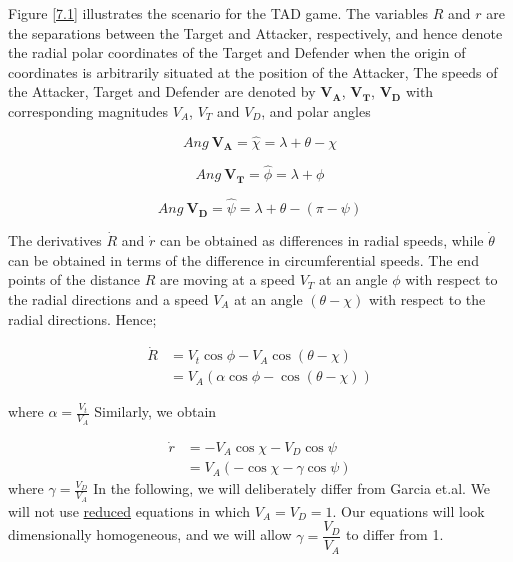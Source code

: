 Figure \ref{7.1} illustrates the scenario for the TAD game. The variables $R$ and $r$ are the separations between the Target and Attacker, respectively, and hence denote the radial polar coordinates of the Target and Defender when the origin of coordinates is arbitrarily situated at the position of the Attacker, The speeds of the Attacker, Target and Defender are denoted by $\boldsymbol{V_A}$, $\boldsymbol{V_T}$, $\boldsymbol{V_D}$ with corresponding magnitudes $V_A$, $V_T$ and $V_D$, and polar angles 

\begin{equation}
	Ang\ \boldsymbol{V_A} = \hat{\chi} = \lambda+\theta-\chi
\end{equation}

\begin{equation}
Ang\ \boldsymbol{V_T} = \hat{\phi} = \lambda+\phi
\end{equation}

\begin{equation}
Ang\ \boldsymbol{V_D} = \hat{\psi} = \lambda+\theta-(\pi - \psi)
\end{equation}



The derivatives $\dot{R}$ and $\dot{r}$ can be obtained as differences in radial speeds, while $\dot{\theta}$ can be obtained in terms of the difference in circumferential speeds. The end points of the distance $R$ are moving at a speed $V_T$ at an angle $\phi$ with respect to the radial directions and a speed $V_A$ at an angle $(\theta - \chi)$ with respect to the radial directions. Hence;

\begin{equation}
\begin{split}
\dot{R} &= V_t \cos \phi - V_A \cos(\theta - \chi)\\
&= V_A (\alpha \cos \phi - \cos(\theta - \chi))
\end{split}
\label{Rdot}
\end{equation}

where $\alpha=\frac{V_t}{V_A}$
Similarly, we obtain 

\begin{equation}
\begin{split}
\dot{r} &= -V_A \cos \chi - V_D \cos\psi\\
&= V_A (- \cos \chi - \gamma\cos\psi)
\end{split}
\label{rdot}
\end{equation}
where $\gamma=\frac{V_D}{V_A}$
In the following, we will deliberately differ from Garcia et.al. \cite{pachter2014active}
We will not use \underline{reduced} equations in which $V_A = V_D = 1$.
Our equations will look dimensionally homogeneous, and we will allow $\gamma = \dfrac{V_D}{V_A}$ to differ from 1.

